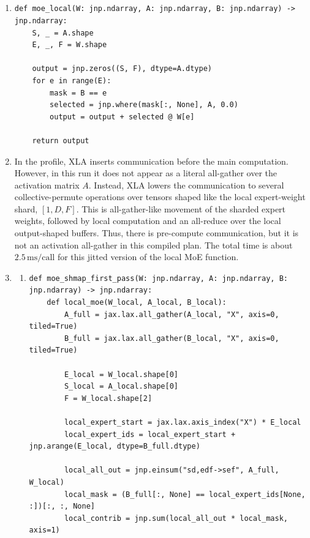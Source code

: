 \documentclass[11pt]{article}
\begin{document}
\subsection{}
\begin{enumerate}
  \item
\begin{lstlisting}[style=pythoncode]
def moe_local(W: jnp.ndarray, A: jnp.ndarray, B: jnp.ndarray) -> jnp.ndarray:
    S, _ = A.shape
    E, _, F = W.shape

    output = jnp.zeros((S, F), dtype=A.dtype)
    for e in range(E):
        mask = B == e
        selected = jnp.where(mask[:, None], A, 0.0)
        output = output + selected @ W[e]

    return output
\end{lstlisting}

  \item
In the profile, XLA inserts communication before the main computation. However,
in this run it does not appear as a literal all-gather over the activation
matrix $A$. Instead, XLA lowers the communication to several
collective-permute operations over tensors shaped like the local expert-weight
shard, $[1,D,F]$. This is all-gather-like movement of the sharded expert
weights, followed by local computation and an all-reduce over the local
output-shaped buffers. Thus, there is pre-compute communication, but it is not
an activation all-gather in this compiled plan. The total time is about
$2.5\,\mathrm{ms/call}$ for this jitted version of the local MoE function.

  \item
\begin{enumerate}[label=\arabic*.]
  \item
\begin{lstlisting}[style=pythoncode]
def moe_shmap_first_pass(W: jnp.ndarray, A: jnp.ndarray, B: jnp.ndarray) -> jnp.ndarray:
    def local_moe(W_local, A_local, B_local):
        A_full = jax.lax.all_gather(A_local, "X", axis=0, tiled=True)
        B_full = jax.lax.all_gather(B_local, "X", axis=0, tiled=True)

        E_local = W_local.shape[0]
        S_local = A_local.shape[0]
        F = W_local.shape[2]

        local_expert_start = jax.lax.axis_index("X") * E_local
        local_expert_ids = local_expert_start + jnp.arange(E_local, dtype=B_full.dtype)

        local_all_out = jnp.einsum("sd,edf->sef", A_full, W_local)
        local_mask = (B_full[:, None] == local_expert_ids[None, :])[:, :, None]
        local_contrib = jnp.sum(local_all_out * local_mask, axis=1)


\end{lstlisting}
\end{enumerate}
\end{enumerate}
\end{document}
